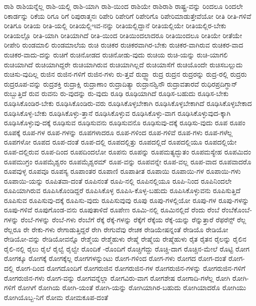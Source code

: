 {ರಾಶಿ
ರಾಶಿಯನ್ನೆಲ್ಲ
ರಾಶಿ-ಯಲ್ಲಿ
ರಾಶಿ-ಯಾಗಿ
ರಾಶಿ-ಯಿಂದ
ರಾಶಿಯೇ
ರಾಶಿರಾಶಿ
ರಾಷ್ಟ್ರ-ವನ್ನು
ರಿಂದಲೂ
ರಿಂದಲೇ
ರಿಕಾರ್ಡನ್ನು
ರಿಕೆಯ
ರಿಗೂ
ರಿಗೆ
ರಿಪುರಾತ್ಮನಃ
ರಿಪೇರಿ
ರಿಪೇರಿಗೆ
ರಿಪೇರಿಗೊ
ರಿಪೇರಿಮಾಡುತ್ತೇವೆಯೋ
ರೀತಿ
ರೀತಿ-ಗಳಿವೆ
ರೀತಿಗೂ
ರೀತಿಯ
ರೀತಿ-ಯಲ್ಲಿ
ರೀತಿಯಲ್ಲಿಇವ-ನನ್ನು
ರೀತಿಯಲ್ಲಿದ್ದಾನೆ
ರೀತಿಯಲ್ಲಿಯೇ
ರೀತಿಯಲ್ಲಿರ-ಬೇಕು
ರೀತಿಯಲ್ಲೊ
ರೀತಿ-ಯಾಗಿ
ರೀತಿಯಾಗಿದೆ
ರೀತಿ-ಯಿಂದ
ರೀತಿಯಿಂದಲಾದರೂ
ರೀತಿಯಿಂದಲೂ
ರೀತಿಯೇ
ರೀತೆಯೇ
ರೀಪೇರಿ
ರುಂಡಮಾಲಿ
ರುಂಡಮಾಲೆಯ
ರುಚಿ
ರುಚಿಕರ
ರುಚಿಕರವಾಗಿರ-ಬೇಕು
ರುಚಿಕರ-ವಾಗಿರುವ
ರುಚಿಕರ-ವಾದ
ರುಚಿಕರ-ವಾದು-ದನ್ನು
ರುಚಿಗೆ
ರುಚಿನೋಡದ
ರುಚಿನೋಡು-ವುದು
ರುಚಿಯ
ರುಚಿ-ಯನ್ನು
ರುಚಿ-ಯಾಗಲಿ
ರುಚಿಯಾಗಿದೆ
ರುಚಿಯಾಗಿದ್ದರೇ
ರುಚಿಯಾಗಿರುವ
ರುಚಿಯಾಗಿಲ್ಲದೆ
ರುಚಿಯಾಸೆಗೆ
ರುಚಿಯೊಂದೇ
ರುಚಿಸಬಲ್ಲುದು
ರುಚಿಸು-ವುದಿಲ್ಲ
ರುಜಿನ
ರುಜಿನ-ಗಳಿಗೆ
ರುಜಿನ-ಗಳು
ರು-ತ್ತವೆ
ರುದ್ಧ್ವಾ
ರುದ್ರ
ರುದ್ರನ
ರುದ್ರರನ್ನು
ರುದ್ರ-ರಲ್ಲಿ
ರುದ್ರರು
ರುದ್ರರೂಪ-ವನ್ನು
ರುದ್ರಶಕ್ತಿ
ರುದ್ರಾಕ್ಷಿ
ರುದ್ರಾಣಾಂ
ರುದ್ರಾದಿತ್ಯಾ
ರುದ್ರಾನಶ್ವಿನೌ
ರುದ್ರಾವತಾರವೆ
ರುಧಿರಪ್ರದಿಗ್ಧಾನ್
ರುಬ್ಬುತ್ತಿದೆ
ರುವ
ರುವನು
ರು-ವುದನ್ನು
ರು-ವುದು
ರೂಢಿ
ರೂಢಿಯಾಗಿದೆ
ರೂಢಿಸ-ಬಹುದು
ರೂಢಿಸ-ಬೇಕು
ರೂಢಿಸಿಕೊಂಡಿರ-ಬೇಕು
ರೂಢಿಸಿಕೊಂಡಿರು-ವರು
ರೂಢಿಸಿಕೊಳ್ಳಬೇಕಾಗಿ
ರೂಢಿಸಿಕೊಳ್ಳಬೇಕಾಗಿದೆ
ರೂಢಿಸಿಕೊಳ್ಳಬೇಕಾದ
ರೂಢಿಸಿಕೊಳ್ಳ-ಬೇಕು
ರೂಢಿಸಿಕೊಳ್ಳು-ತ್ತಾನೆ
ರೂಢಿಸಿಕೊಳ್ಳುವ
ರೂಢಿಸಿಕೊಳ್ಳು-ವಾಗ
ರೂಢಿಸಿಕೊಳ್ಳುವುದ-ಕ್ಕಾಗಿ
ರೂಢಿಸಿಕೊಳ್ಳುವು-ದಕ್ಕೆ
ರೂಢಿಸುವ
ರೂಢಿಸುವನು
ರೂಢಿಸುವನೊ
ರೂಢಿಸುವು-ದಕ್ಕೆ
ರೂಢಿಸು-ವುದು
ರೂಪ
ರೂಪಂ
ರೂಪಕ್ಕೆ
ರೂಪ-ಗಳ
ರೂಪ-ಗಳನ್ನು
ರೂಪಗಳಾದರೂ
ರೂಪ-ಗಳಿಂದ
ರೂಪ-ಗಳಿವೆ
ರೂಪ-ಗಳು
ರೂಪ-ಗಳೆಲ್ಲ
ರೂಪಗಳೋ
ರೂಪದ
ರೂಪ-ದಂತೆ
ರೂಪ-ದಲ್ಲಿ
ರೂಪದಲ್ಲಿತ್ತು
ರೂಪದಲ್ಲಿದೆ
ರೂಪದಲ್ಲಿಯೂ
ರೂಪದಲ್ಲಿಯೇ
ರೂಪ-ದಲ್ಲಿರುವ
ರೂಪ-ದಿಂದ
ರೂಪದಿಂದಲೋ
ರೂಪನು
ರೂಪನ್ನು
ರೂಪಮತ್ಯದ್ಭುತಂ
ರೂಪಮಸ್ಯೇಹ
ರೂಪಮಿದಂ
ರೂಪಮುಗ್ರಂ
ರೂಪಮೈಶ್ವರಂ
ರೂಪಮೈಶ್ವರಮ್
ರೂಪ-ವನ್ನು
ರೂಪವನ್ನೇ
ರೂಪ-ವಲ್ಲ
ರೂಪ-ವಾದ
ರೂಪವಾದರೊ
ರೂಪವುಳ್ಳ
ರೂಪವೂ
ರೂಪಸ್ಯ
ರೂಪಾಂತರ
ರೂಪಾಣಿ
ರೂಪಾತೀತ
ರೂಪಾಯಿ
ರೂಪಾಯಿ-ಗಳ
ರೂಪಾಯಿ-ಗಳು
ರೂಪಾಯಿ-ಯನ್ನು
ರೂಪಿತವಾ-ದಂತೆ
ರೂಪಿನಂತೆ
ರೂಪಿ-ನಲ್ಲಿ
ರೂಪಿನಲ್ಲಿಯೂ
ರೂಪಿ-ನಿಂದ
ರೂಪಿನಿಂದಲೇ
ರೂಪಿಯಾಗಿರುವ
ರೂಪಿಸಿಕೊಂಡಿದ್ದರೆ
ರೂಪಿಸಿಕೊಳ್ಳ
ರೂಪಿಸಿ-ಕೊಳ್ಳ-ಬಹುದು
ರೂಪಿಸಿಕೊಳ್ಳುವನು
ರೂಪಿಸುತ್ತಿದೆ
ರೂಪಿಸುವ
ರೂಪಿಸುವು-ದಕ್ಕೆ
ರೂಪಿಸು-ವುದು
ರೂಪಿಸುವುವು
ರೂಪು
ರೂಪು-ಗಳಲ್ಲಿಯೋ
ರೂಪು-ಗಳ
ರೂಪು-ಗಳನ್ನು
ರೂಪು-ಗಳಿವೆ
ರೂಪುಗೊಂಡ-ವನು
ರೂಪುತಾಳಿದೆ
ರೂಪೇಣ
ರೂಮಿ-ನಲ್ಲಿ
ರೂಮಿನಲ್ಲಿದೆ
ರೆಂದು
ರೆಂಬೆ
ರೆಂಬೆಕೊಂಬೆ-ಗಳನ್ನು
ರೆಂಬೆ-ಗಳನ್ನು
ರೆಂಬೆ-ಗಳು
ರೆಂಬೆಗೆ
ರೆಕ್ಕೆ
ರೆಕ್ಕೆ-ಗಳನ್ನು
ರೆಕ್ಕೆಗೆ
ರೆಕ್ಕೆಯ
ರೆಕ್ಕೆ-ಯನ್ನು
ರೆನ್ನುತ್ತಾರೆ
ರೆಫರೆನ್ಸ್
ರೆಲ್ಲ
ರೆಲ್ಲರೂ
ರೇ
ರೇಕು-ಗಳು
ರೇಗಾಡುತ್ತಿದ್ದರೆ
ರೇಗಿ
ರೇಗುವೆವು
ರೇಚಕ
ರೇಡಿಯೇಷನ್ನಂತೆ
ರೇಡಿಯೊ
ರೇಡಿಯೋ
ರೇಡಿಯೋ-ವನ್ನು
ರೇಡಿಯೋವನ್ನೊ
ರೇಶ್ಮೆಯ
ರೇಶ್ಮೆಹುಳು
ರೇಷ್ಮೆ
ರೇಷ್ಮೆಯ
ರೇಷ್ಮೆಹುಳು
ರೈತ
ರೈತನ
ರೈಲನ್ನು
ರೈಲಿನ
ರೈಲಿ-ನಲ್ಲಿ
ರೈಲು
ರೈಲೆ
ರೈಲ್ವೆ
ರೈಲ್ವೇ
ರೊಂದಿಕೆ
-ರೊಂದಿಗೆ
ರೊಚ್ಚಿಗೆದ್ದು
ರೊಚ್ಚಿ-ದಾಗ
ರೊಚ್ಚಿನ-ಮೇಲೆ
ರೊಟ್ಟಿ
ರೋಗ
ರೋಗಕ್ಕೂ
ರೋಗಕ್ಕೆ
ರೋಗಕ್ಕೆಲ್ಲ
ರೋಗಗಳನ್ನುಂಟು
ರೋಗ-ಗಳಿಂದ
ರೋಗ-ಗಳು
ರೋಗದ
ರೋಗ-ದಂತೆ
ರೋಗ-ದಲ್ಲಿ
ರೋಗ-ದಿಂದ
ರೋಗದೊಂದಿಗೆ
ರೋಗರುಜಿನ
ರೋಗರುಜಿನ-ಗಳ
ರೋಗರುಜಿನ-ಗಳನ್ನು
ರೋಗರುಜಿನ-ಗಳಿಗೆ
ರೋಗರುಜಿನ-ಗಳು
ರೋಗ-ವನ್ನು
ರೋಗವನ್ನೆಲ್ಲಾ
ರೋಗವಿರು-ವಾಗ
ರೋಗಶೇಷ
ರೋಗಾದಿ-ಗಳೆಲ್ಲ
ರೋಗಿ
ರೋಗಿ-ಗಳಿಗೆ
ರೋಗಿಗೆ
ರೋಗಿಯ
ರೋಗಿ-ಯಂತೆ
ರೋಗಿ-ಯನ್ನು
ರೋಗಿಯಾಗಿರ-ಬಹುದು
ರೋಗಿಯಾದರೊ
ರೋಗಿಯು
ರೋಗಿಯೊಬ್ಬ-ನಿಗೆ
ರೋಮ
ರೋಮಕೂಪ-ದಂತೆ
}
